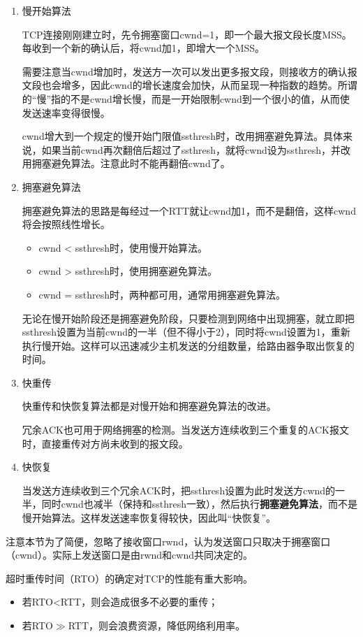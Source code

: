 \documentclass[12pt, a4paper, oneside]{ctexart}
\begin{document}
\begin{enumerate}
    \item 慢开始算法

    TCP连接刚刚建立时，先令拥塞窗口cwnd=1，即一个最大报文段长度MSS。每收到一个新的确认后，将cwnd加1，即增大一个MSS。

    需要注意当cwnd增加时，发送方一次可以发出更多报文段，则接收方的确认报文段也会增多，因此cwnd的增长速度会加快，从而呈现一种指数的趋势。所谓的“慢”指的不是cwnd增长慢，而是一开始限制cwnd到一个很小的值，从而使发送速率变得很慢。

    cwnd增大到一个规定的慢开始门限值ssthresh时，改用拥塞避免算法。具体来说，如果当前cwnd再次翻倍后超过了ssthresh，就将cwnd设为ssthresh，并改用拥塞避免算法。注意此时不能再翻倍cwnd了。
    \item 拥塞避免算法

    拥塞避免算法的思路是每经过一个RTT就让cwnd加1，而不是翻倍，这样cwnd将会按照线性增长。
    \begin{itemize}
        \item cwnd < ssthresh时，使用慢开始算法。
        \item cwnd > ssthresh时，使用拥塞避免算法。
        \item cwnd = ssthresh时，两种都可用，通常用拥塞避免算法。
    \end{itemize}
    无论在慢开始阶段还是拥塞避免阶段，只要检测到网络中出现拥塞，就立即把ssthresh设置为当前cwnd的一半（但不得小于2），同时将cwnd设置为1，重新执行慢开始。这样可以迅速减少主机发送的分组数量，给路由器争取出恢复的时间。
    \item 快重传

    快重传和快恢复算法都是对慢开始和拥塞避免算法的改进。

    冗余ACK也可用于网络拥塞的检测。当发送方连续收到三个重复的ACK报文时，直接重传对方尚未收到的报文段。
    \item 快恢复

    当发送方连续收到三个冗余ACK时，把ssthresh设置为此时发送方cwnd的一半，同时cwnd也减半（保持和ssthresh一致），然后执行\textbf{拥塞避免算法}，而不是慢开始算法。这样发送速率恢复得较快，因此叫“快恢复”。
\end{enumerate}

注意本节为了简便，忽略了接收窗口rwnd，认为发送窗口只取决于拥塞窗口（cwnd）。实际上发送窗口是由rwnd和cwnd共同决定的。

\vspace{20pt}
超时重传时间（RTO）的确定对TCP的性能有重大影响。
\begin{itemize}
    \item 若RTO<RTT，则会造成很多不必要的重传；
    \item 若RTO$\gg$RTT，则会浪费资源，降低网络利用率。
\end{itemize}
\end{document}
